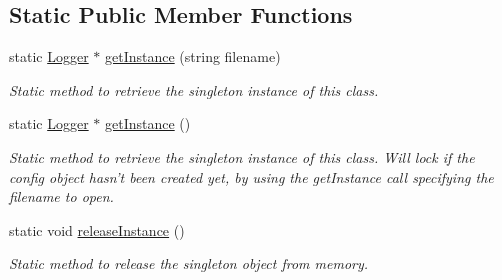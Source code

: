 \subsection*{Static Public Member Functions}
\begin{DoxyCompactItemize}
\item 
static \hyperlink{class_logger}{Logger} $\ast$ \hyperlink{class_logger_a21c1e2e01bd8f65dd7a4cfc179bfa9af}{getInstance} (string filename)
\begin{DoxyCompactList}\small\item\em Static method to retrieve the singleton instance of this class. \end{DoxyCompactList}\item 
static \hyperlink{class_logger}{Logger} $\ast$ \hyperlink{class_logger_afec28ae6d7bdf8f6a0734cb20756de10}{getInstance} ()
\begin{DoxyCompactList}\small\item\em Static method to retrieve the singleton instance of this class. Will lock if the config object hasn't been created yet, by using the getInstance call specifying the filename to open. \end{DoxyCompactList}\item 
\hypertarget{class_logger_a0a9aea6dcc43c134a1e0b97e44934f9b}{
static void \hyperlink{class_logger_a0a9aea6dcc43c134a1e0b97e44934f9b}{releaseInstance} ()}
\label{class_logger_a0a9aea6dcc43c134a1e0b97e44934f9b}

\begin{DoxyCompactList}\small\item\em Static method to release the singleton object from memory. \end{DoxyCompactList}\end{DoxyCompactItemize}
